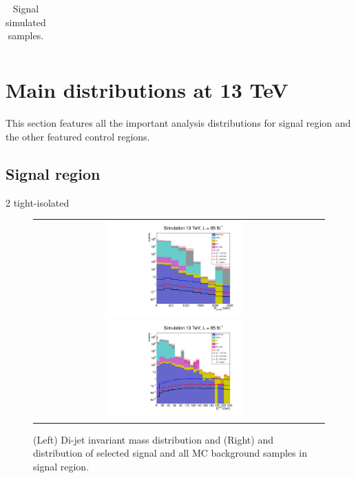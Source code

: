 \begin{table}[ht]
{\begin{tabular}{| l | l |}
			\hline
		\end{tabular}
	}
	\caption{Signal simulated samples.}
	\label{table:samples_signal_13tev} %
\end{table}

\clearpage

\section{Main distributions at 13 TeV}

This section features all the important analysis distributions for signal region and the other featured control regions.

\subsection*{Signal region}

\FloatBarrier

2 tight-isolated \hadtau

\begin{figure}[tbh!]
	\centering
	\begin{tabular}{cc}
		\includegraphics[width=0.5\textwidth]{analysis/pics/h_dijetinvariantmass_Taui2TightIso.pdf}
		\includegraphics[width=0.5\textwidth]{analysis/pics/h_met_Taui2TightIso.pdf}
	\end{tabular}
	\caption{(Left) Di-jet invariant mass distribution and (Right) and \met distribution of selected signal and all MC background samples in signal region.}
	\label{fig::crplots1_Taui2TightIso_13tev}
\end{figure}

